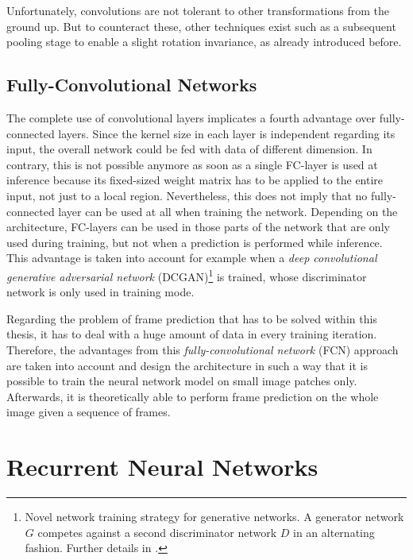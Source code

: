 Unfortunately, convolutions are not tolerant to other transformations from the ground up. But to counteract these, other techniques exist such as a subsequent pooling stage to enable a slight rotation invariance, as already introduced before.


\subsection{Fully-Convolutional Networks} \label{sec:fcn}

The complete use of convolutional layers implicates a fourth advantage over fully-connected layers. Since the kernel size in each layer is independent regarding its input, the overall network could be fed with data of different dimension. In contrary, this is not possible anymore as soon as a single FC-layer is used at inference because its fixed-sized weight matrix has to be applied to the entire input, not just to a local region. Nevertheless, this does not imply that no fully-connected layer can be used at all when training the network. Depending on the architecture, FC-layers can be used in those parts of the network that are only used during training, but not when a prediction is performed while inference. This advantage is taken into account for example when a \textit{deep convolutional generative adversarial network} (DCGAN)\footnote{Novel network training strategy for generative networks. A generator network $ G $ competes against a second discriminator network $ D $ in an alternating fashion. Further details in \parencite{gan}.} is trained, whose discriminator network is only used in training mode.

Regarding the problem of frame prediction that has to be solved within this thesis, it has to deal with a huge amount of data in every training iteration. Therefore, the advantages from this \textit{fully-convolutional network} (FCN) approach are taken into account and design the architecture in such a way that it is possible to train the neural network model on small image patches only. Afterwards, it is theoretically able to perform frame prediction on the whole image given a sequence of frames.


\section{Recurrent Neural Networks}

